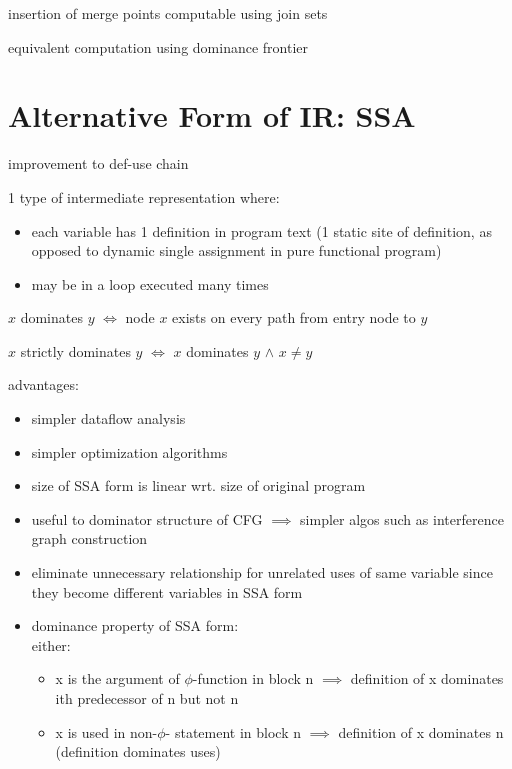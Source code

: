 \documentclass[8pt]{extarticle}
\begin{document}
\begin{multicols*}{2}
  insertion of merge points computable using join sets

  equivalent computation using dominance frontier
  
  \vfill\null
  \columnbreak

  \section{Alternative Form of IR: SSA}

  improvement to def-use chain

  1 type of intermediate representation where:
  \begin{itemize}
  \item each variable has 1 definition in program text (1 static site of definition, as opposed to dynamic single assignment in pure functional program)
  \item may be in a loop executed many times
  \end{itemize}

  $x$ dominates $y$ $\iff$ node $x$ exists on every path from entry node to $y$

  $x$ strictly dominates $y$ $\iff$ $x$ dominates $y$ $\wedge$ $x \neq y$
  
  advantages:
  \begin{itemize}
  \item simpler dataflow analysis
  \item simpler optimization algorithms
  \item size of SSA form is linear wrt. size of original program
  \item useful to dominator structure of CFG $\implies$ simpler algos such as interference graph construction
  \item eliminate unnecessary relationship for unrelated uses of same variable since they become different variables in SSA form
  \item dominance property of SSA form:\\
    either:
    \begin{itemize}
    \item x is the argument of $\phi$-function in block n $\implies$ definition of x dominates ith predecessor of n but not n
    \item x is used in non-$\phi$- statement in block n $\implies$ definition of x dominates n (definition dominates uses)
    \end{itemize}
  \end{itemize}


\end{multicols*}
\end{document}
